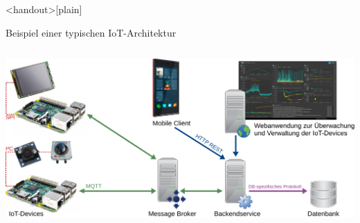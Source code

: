 {

\begin{frame}<handout>[plain]
\end{frame}
}

\begin{frame}{Beispiel einer typischen IoT-Architektur}
    \begin{columns}
        \column{\dimexpr\paperwidth-10pt}
        \includegraphics[width=\textwidth]{img/architektur_beispiel}
    \end{columns}
\end{frame}

